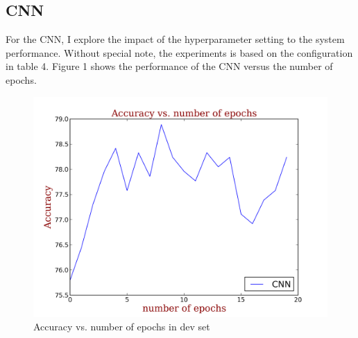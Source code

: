 \documentclass[11pt,a4paper]{article}
\begin{document}
%

\subsection{CNN}

For the CNN, I explore the impact of the hyperparameter setting to the system performance. 
Without special note, the experiments is based on the configuration in table 4. Figure 1
shows the performance of the CNN versus the number of epochs.

\begin{figure}[h]
\includegraphics[scale=0.5]{cnn-epoch.png}
\caption{Accuracy vs. number of epochs in dev set}
\end{figure}
\end{document}
